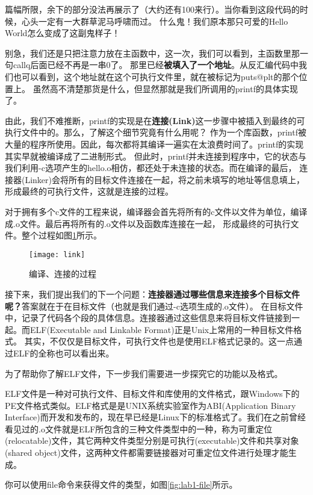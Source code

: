 篇幅所限，余下的部分没法再展示了（大约还有100来行）。当你看到这段代码的时候，心头一定有一大群草泥马呼啸而过。
什么鬼！我们原本那只可爱的Hello World怎么变成了这副鬼样子！

别急，我们还是只把注意力放在主函数中，这一次，我们可以看到，主函数里那一句callq后面已经不再是一串0了。
那里已经\textbf{被填入了一个地址}。从反汇编代码中我们也可以看到，这个地址就在这个可执行文件里，就在被标记为puts@plt的那个位置上。
虽然高不清楚那货是什么，但显然那就是我们所调用的printf的具体实现了。

由此，我们不难推断，printf的实现是在\textbf{连接(Link)}这一步骤中被插入到最终的可执行文件中的。那么，了解这个细节究竟有什么用呢？
作为一个库函数，printf被大量的程序所使用。因此，每次都将其编译一遍实在太浪费时间了。printf的实现其实早就被编译成了二进制形式。
但此时，printf并未连接到程序中，它的状态与我们利用-c选项产生的hello.o相仿，都还处于未连接的状态。而在编译的最后，
连接器(Linker)会将所有的目标文件连接在一起，将之前未填写的地址等信息填上，形成最终的可执行文件，这就是连接的过程。

对于拥有多个c文件的工程来说，编译器会首先将所有的c文件以文件为单位，编译成.o文件。最后再将所有的.o文件以及函数库连接在一起，
形成最终的可执行文件。整个过程如图\ref{fig:link}所示。

\begin{figure}[htbp]
  \centering
  \texttt{[image: link]}
  \caption{编译、连接的过程}\label{fig:link} 
\end{figure}

接下来，我们提出我们的下一个问题：\textbf{连接器通过哪些信息来连接多个目标文件呢？}答案就在于在目标文件（也就是我们通过-c选项生成的.o文件）。
在目标文件中，记录了代码各个段的具体信息。连接器通过这些信息来将目标文件链接到一起。而ELF(Executable and Linkable Format)正是Unix上常用的一种目标文件格式。
其实，不仅仅是目标文件，可执行文件也是使用ELF格式记录的。这一点通过ELF的全称也可以看出来。

为了帮助你了解ELF文件，下一步我们需要进一步探究它的功能以及格式。

ELF文件是一种对可执行文件、目标文件和库使用的文件格式，跟Windows下的PE文件格式类似。ELF格式是是UNIX系统实验室作为ABI(Application Binary Interface)而开发和发布的，现在早已经是Linux下的标准格式了。我们在之前曾经看见过的.o文件就是ELF所包含的三种文件类型中的一种，称为可重定位(relocatable)文件，其它两种文件类型分别是可执行(executable)文件和共享对象(shared object)文件，这两种文件都需要链接器对可重定位文件进行处理才能生成。

你可以使用file命令来获得文件的类型，如图\ref{fig:lab1-file}所示。

